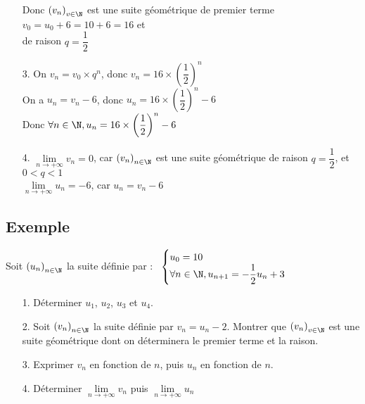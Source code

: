 \begin{itemize}
Donc $\left(v_n\right)_{v \in \N}$ est une suite géométrique de premier terme $v_0 = u_0 + 6 = 10 + 6 = 16$ et \\ de raison $q = \dfrac{1}{2}$ \vspace*{.3cm} \\

\item[3.] On $v_n = v_0 \times q^n$, donc $v_n = 16 \times \left(\dfrac{1}{2}\right)^n$ \\

On a $u_n = v_n - 6$, donc $u_n = 16 \times \left(\dfrac{1}{2}\right)^n - 6$ \\

Donc $\forall n \in \N, u_n = 16 \times \left(\dfrac{1}{2}\right)^n - 6$ \\

\item[4.] $\lim\limits_{n \to +\infty} v_n = 0$, car $\left(v_n\right)_{n \in \N}$ est une suite géométrique de raison $q = \dfrac{1}{2}$, et $ 0 < q < 1$ \\

$\lim\limits_{n \to +\infty} u_n = -6$, car $u_n = v_n - 6$ 
\end{itemize}

\vspace*{-5cm}

\newpage

\subsection{Exemple }

Soit $\left(u_n\right)_{n \in \N}$ la suite définie par :$ \; \; \; \begin{cases}
u_0 = 10 \\
\forall n \in \N, u_{n+1} = -\dfrac{1}{2} u_n + 3 \\
\end{cases}$ \\

\begin{itemize}
\item[1.] Déterminer $u_1$, $u_2$, $u_3$ et $u_4$. 
\item[2.] Soit $\left(v_n\right)_{n \in \N}$ la suite définie par $v_n = u_n - 2$. Montrer que $\left(v_n\right)_{v \in \N}$ est une suite géométrique dont on déterminera le premier terme et la raison. 
\item[3.] Exprimer $v_n$ en fonction de $n$, puis $u_n$ en fonction de $n$. 
\item[4.]  Déterminer $\lim\limits_{n \to +\infty} v_n$ puis $\lim\limits_{n \to +\infty} u_n$ \\
\end{itemize}

